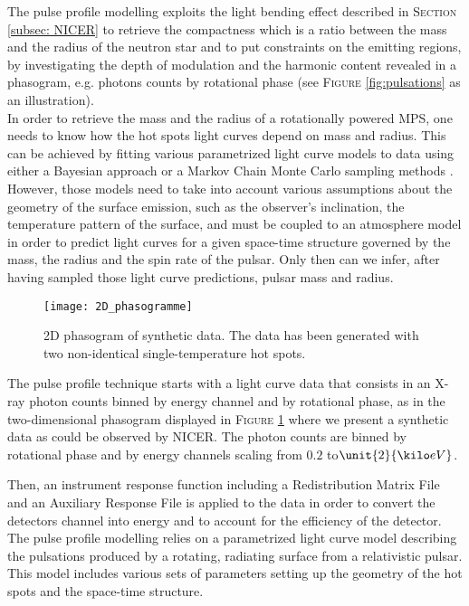 \documentclass[a4paper, twoside, 12pt]{article}
\numberwithin{equation}{section}
\begin{document}
\hspace{\parindent}	The pulse profile modelling exploits the light bending effect described in S\textsc{ection} \ref{subsec: NICER} to retrieve the compactness which is a ratio between the mass and the radius of the neutron star and to put  constraints on the emitting regions, by investigating the depth of modulation and the harmonic content revealed in a phasogram, e.g. photons counts by rotational phase (see F\textsc{igure} \ref{fig:pulsations} as an illustration). \\

In order to retrieve the mass and the radius of a rotationally powered MPS, one needs to know how the hot spots light curves depend on mass and radius. This can be achieved by fitting various parametrized light curve models to data using either a Bayesian approach or a Markov Chain Monte Carlo sampling methods \cite{miller}. However, those models need to take into account various assumptions about the geometry of the surface emission, such as the observer's inclination, the temperature pattern of the surface, and must be coupled to an atmosphere model in order to predict light curves for a given space-time structure governed by the mass, the radius and the spin rate of the pulsar. Only then can we infer, after having sampled those light curve predictions, pulsar mass and radius. \\
\begin{figure}[!h]
\centering
\texttt{[image: 2D\_phasogramme]}
\caption[2D phasogram of synthetic data]{2D phasogram of synthetic data. The data has been generated with two non-identical 
single-temperature hot spots.  }
\label{fig: phaso2D}
\end{figure}

The pulse profile technique starts with a light curve data that consists in an X-ray photon counts binned by energy channel and by rotational phase, as in the two-dimensional phasogram displayed in F\textsc{igure} \ref{fig: phaso2D} where we present a synthetic data as could be observed by NICER. The photon counts are binned by rotational phase
and by energy channels scaling from $0.2$ to$\unit{2}{\kilo eV}$.

Then, an instrument response function including a Redistribution Matrix File and an Auxiliary Response File is applied to the data in order to convert the detectors channel into energy and to account for the efficiency of the detector. The pulse profile modelling relies on a parametrized light curve model describing the pulsations produced by a rotating, radiating surface from a relativistic pulsar. This model includes various sets of parameters setting up the geometry of the hot spots and the space-time structure. 
\end{document}

